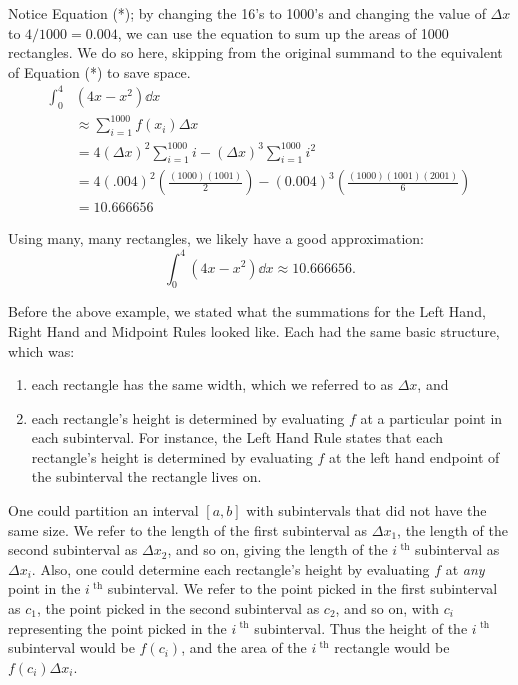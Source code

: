 \begin{example}
Notice  Equation (*); by changing the 16's to 1000's and changing the value of $\Delta x$ to $4/1000=0.004$, we can use the equation to sum up the areas of 1000 rectangles. We do so here, skipping from the original summand to the equivalent of Equation (*) to save space.
\begin{align*}
\int_0^4 &(4x-x^2)\dd x \\
&\approx \sum_{i=1}^{1000} f(x_i)\Delta x\\
&=4(\Delta x)^2\sum_{i=1}^{1000} i -(\Delta x)^3\sum_{i=1}^{1000} i^2\\
&=4(.004)^2\left(\frac{(1000)(1001)}{2}\right) -(0.004)^3\left(\frac{(1000)(1001)(2001)}{6}\right)\\
&=10.666656
\end{align*}

Using many, many rectangles, we likely have a good approximation:
\[\int_0^4 (4x-x^2)\dd x\approx 10.666656.\]
\end{example}

Before the above example, we stated what the summations for the Left Hand, Right Hand and Midpoint Rules looked like. Each had the same basic structure, which was:
\begin{enumerate}
	\item each rectangle has the same width, which we referred to as $\Delta x$, and
	\item each rectangle's height is determined by evaluating $f$ at a particular point in each subinterval. For instance, the Left Hand Rule states that each rectangle's height is determined by evaluating $f$ at the left hand endpoint of the subinterval the rectangle lives on.
\end{enumerate}
One could partition an interval $[a,b]$ with subintervals that did not have the same size. We refer to the length of the first subinterval as $\Delta x_1$, the length of the second subinterval as $\Delta x_2$, and so on, giving the length of the $i^\text{ th}$ subinterval as $\Delta x_i$. Also, one could determine each rectangle's height by evaluating $f$ at \emph{any} point in the $i^\text{ th}$ subinterval. We refer to the point picked in the first subinterval as $c_1$, the point picked in the second subinterval as $c_2$, and so on, with $c_i$ representing the point picked in the $i^\text{ th}$ subinterval. Thus the height of the $i^\text{ th}$ subinterval would be $f(c_i)$, and the area of the $i^\text{ th}$ rectangle would be $f(c_i)\Delta x_i$.

